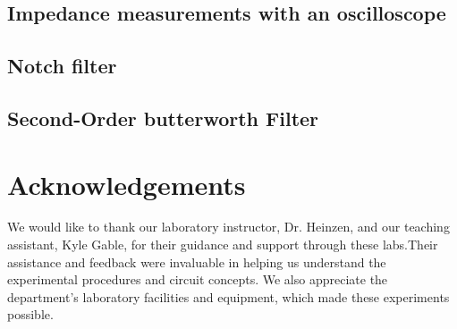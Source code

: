 \documentclass{article}
\begin{document}
\subsection{Impedance measurements with an oscilloscope}

\subsection{Notch filter}


\subsection{Second-Order butterworth Filter}


\section*{Acknowledgements}

We would like to thank our laboratory instructor, Dr. Heinzen, and our teaching 
assistant, Kyle Gable, for their guidance and support through these labs.Their 
assistance and feedback were invaluable in helping us understand the experimental 
procedures and circuit concepts. We also appreciate the department's laboratory 
facilities and equipment, which made these experiments possible.
\end{document}
